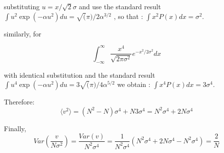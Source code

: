 \documentclass[fleqn,usenatbib]{mnras}  %
\begin{document}
substituting $u = x / \sqrt{2} \sigma$ and use the standard result  $\int u^{2} \exp(-\alpha u^{2})du = \sqrt(\pi)/2\alpha^{3/2}$ , so that :   $\int x^{2} P(x) dx = \sigma^{2}$. 

similarly, for 

\begin{equation}
\int_{-\infty}^{\infty} \frac{x^{4}}{\sqrt{2\pi \sigma^{2}}} e^{-x^{2} / 2 \sigma^{2}} dx 
\end{equation}

with identical substitution and the standard result  $\int u^{4} \exp(-\alpha u^{2})du =3 \sqrt(\pi)/4\alpha^{5/2}$ we obtain : $\int x^{4} P(x) dx = 3 \sigma^{4}$.  

Therefore:
\begin{equation}
\langle v^{2} \rangle = (N^{2}-N) \sigma^{4} + N 3\sigma^{4} = N^{2}\sigma^{4} + 2N\sigma^{4}
\end{equation}

Finally, 
\begin{equation}
Var\left(\frac{v}{N \sigma^{2}}\right) = \frac{Var(v)}{N^{2} \sigma^{4}}  = \frac{1}{N^{2}\sigma^{4}}(N^{2}\sigma^{4} + 2N\sigma^{4}-N^{2}\sigma^{4}) = \frac{2}{N}
\end{equation}







\bsp	%
\label{lastpage}
\end{document}
